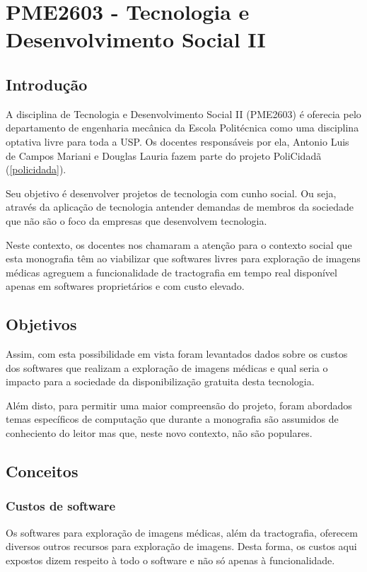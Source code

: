 \chapter{PME2603 - Tecnologia e Desenvolvimento Social II}
\section{Introdução}
A disciplina de Tecnologia e Desenvolvimento Social II (PME2603) é oferecia pelo departamento de engenharia mecânica da Escola Politécnica como uma disciplina optativa livre para toda a USP. Os docentes responsáveis por ela, Antonio Luis de Campos Mariani e Douglas Lauria fazem parte do projeto PoliCidadã (\ref{policidada}).

Seu objetivo é desenvolver projetos de tecnologia com cunho social. Ou seja, através da aplicação de tecnologia antender demandas de membros da sociedade que não são o foco da empresas que desenvolvem tecnologia.

Neste contexto, os docentes nos chamaram a atenção para o contexto social que esta monografia têm ao viabilizar que softwares livres para exploração de imagens médicas agreguem a funcionalidade de tractografia em tempo real disponível apenas em softwares proprietários e com custo elevado.

\section{Objetivos}
Assim, com esta possibilidade em vista foram levantados dados sobre os custos dos softwares que realizam a exploração de imagens médicas e qual seria o impacto para a sociedade da disponibilização gratuita desta tecnologia.

Além disto, para permitir uma maior compreensão do projeto, foram abordados temas específicos de computação que durante a monografia são assumidos de conheciento do leitor mas que, neste novo contexto, não são populares.

\section{Conceitos}
  \subsection{Custos de software}
  Os softwares para exploração de imagens médicas, além da tractografia, oferecem diversos outros recursos para exploração de imagens. Desta forma, os custos aqui expostos dizem respeito à todo o software e não só apenas à funcionalidade.
  
